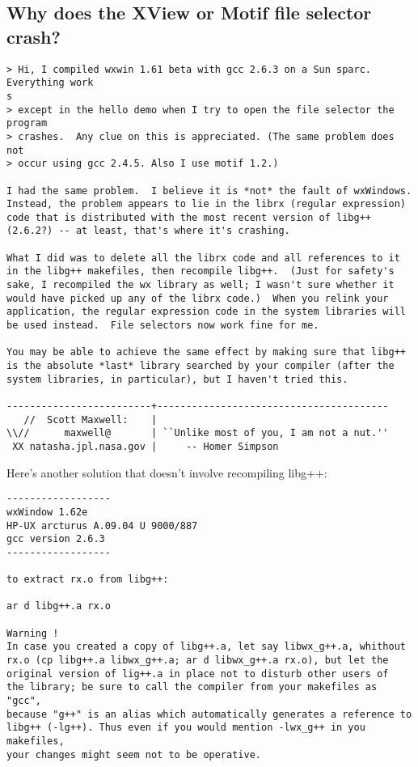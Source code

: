 \subsection{Why does the XView or Motif file selector crash?}

\begin{verbatim}
> Hi, I compiled wxwin 1.61 beta with gcc 2.6.3 on a Sun sparc.  Everything work
s
> except in the hello demo when I try to open the file selector the program 
> crashes.  Any clue on this is appreciated. (The same problem does not
> occur using gcc 2.4.5. Also I use motif 1.2.)

I had the same problem.  I believe it is *not* the fault of wxWindows.
Instead, the problem appears to lie in the librx (regular expression)
code that is distributed with the most recent version of libg++
(2.6.2?) -- at least, that's where it's crashing.

What I did was to delete all the librx code and all references to it
in the libg++ makefiles, then recompile libg++.  (Just for safety's
sake, I recompiled the wx library as well; I wasn't sure whether it
would have picked up any of the librx code.)  When you relink your
application, the regular expression code in the system libraries will
be used instead.  File selectors now work fine for me.

You may be able to achieve the same effect by making sure that libg++
is the absolute *last* library searched by your compiler (after the
system libraries, in particular), but I haven't tried this.

-------------------------+----------------------------------------
   //  Scott Maxwell:    |  
\\//      maxwell@       | ``Unlike most of you, I am not a nut.''
 XX natasha.jpl.nasa.gov |     -- Homer Simpson
\end{verbatim}

Here's another solution that doesn't involve recompiling libg++:

\begin{verbatim}
------------------
wxWindow 1.62e
HP-UX arcturus A.09.04 U 9000/887
gcc version 2.6.3
------------------

to extract rx.o from libg++:

ar d libg++.a rx.o

Warning !
In case you created a copy of libg++.a, let say libwx_g++.a, whithout
rx.o (cp libg++.a libwx_g++.a; ar d libwx_g++.a rx.o), but let the 
original version of lig++.a in place not to disturb other users of
the library; be sure to call the compiler from your makefiles as "gcc",
because "g++" is an alias which automatically generates a reference to
libg++ (-lg++). Thus even if you would mention -lwx_g++ in you makefiles, 
your changes might seem not to be operative.
\end{verbatim}

